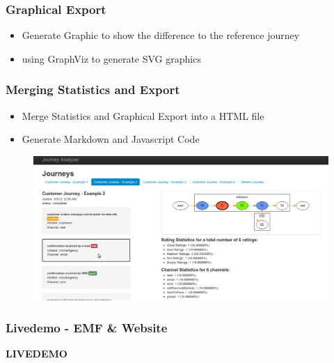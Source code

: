 \documentclass[13pt]{beamer}
\begin{document}
\begin{frame}
	\frametitle{Graphical Export}
	\begin{itemize}
		\item Generate Graphic to show the difference to the reference journey
		\item using GraphViz to generate SVG graphics
	\end{itemize}
\end{frame}

\begin{frame}
	\frametitle{Merging Statistics and Export}
	\begin{itemize}
		\item Merge Statistics and Graphical Export into a HTML file
		\item Generate Markdown and Javascript Code
	\end{itemize}
	\begin{figure}[hbtp]
			\centering
			\includegraphics[scale=0.25]{img/merge_sample1.png}
	\end{figure}
\end{frame}	

\begin{frame}
	\frametitle{Livedemo - EMF \& Website}
	\begin{center} \huge{\textbf{LIVEDEMO}} \end{center}
\end{frame}
\end{document}
